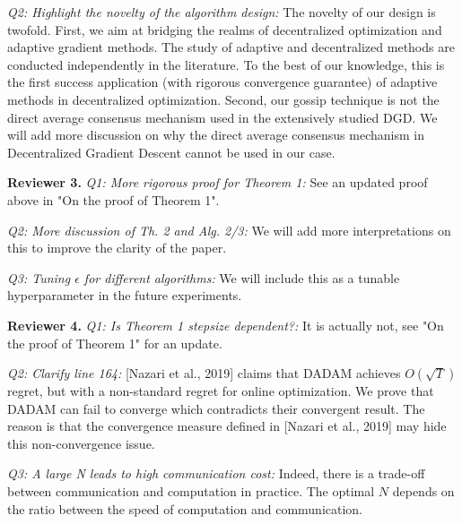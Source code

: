\documentclass{article}
\begin{document}
\textit{Q2: Highlight the novelty of the algorithm design:}
The novelty of our design is twofold.
First, we aim at bridging the realms of decentralized optimization and adaptive gradient methods. 
The study of adaptive and decentralized methods are conducted independently in the literature. 
To the best of our knowledge, this is the first success application (with rigorous convergence guarantee) of adaptive methods in decentralized optimization. 
Second, our gossip technique is not the direct average consensus mechanism used in the extensively studied DGD.
We will add more discussion on why the direct average consensus mechanism in Decentralized Gradient Descent cannot be used in our case.\vspace{-5pt}

\textbf{Reviewer 3.}
\textit{Q1: More rigorous proof for Theorem 1:}
 See an updated proof above in "On the proof of Theorem 1".\vspace{-5pt}

\textit{Q2: More discussion of Th. 2 and Alg. 2/3:}
We will add more interpretations on this to improve the clarity of the paper.\vspace{-5pt}

\textit{Q3: Tuning $\epsilon$ for different algorithms:}
We will include this as a tunable hyperparameter in the future experiments. \vspace{-5pt}

\textbf{Reviewer 4.}
\textit{Q1: Is Theorem 1 stepsize dependent?:} It is actually not, see "On the proof of Theorem 1" for an update.\vspace{-5pt}

\textit{Q2:  Clarify line 164:}
 [Nazari et al., 2019] claims that DADAM achieves $O(\sqrt{T})$ regret, but with a non-standard regret for online optimization. 
 We prove that DADAM can fail to converge which contradicts their convergent result. 
 The reason is that the convergence measure defined in [Nazari et al., 2019] may hide this non-convergence issue.\vspace{-5pt}

\textit{Q3: A large N leads to high communication cost:}
Indeed, there is a trade-off between communication and computation in practice.
The optimal $N$ depends on the ratio between the speed of computation and communication.   \vspace{-5pt}
\end{document}
